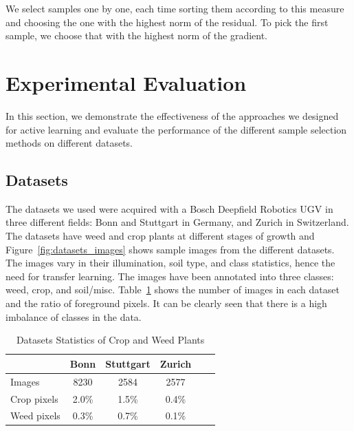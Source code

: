 \documentclass[letterpaper, 10 pt, conference]{ieeeconf}  %
\begin{document}
We select samples one by one, each time sorting them according to this measure and choosing the one with the highest norm of the residual. To pick the first sample, we choose that with the highest norm of the gradient.



\section{Experimental Evaluation}
\label{sec:exp}

In this section, we demonstrate the effectiveness of the approaches we designed for active learning and evaluate the performance of the different sample selection methods on different datasets.

\subsection{Datasets}

The datasets we used were acquired with a Bosch Deepfield Robotics UGV in three different fields: Bonn and Stuttgart in Germany, and Zurich in Switzerland. The datasets have weed and crop plants at different stages of growth and Figure~\ref{fig:datasets_images} shows sample images from the different datasets. The images vary in their illumination, soil type, and class statistics, hence the need for transfer learning. The images have been annotated into three classes:  weed, crop, and soil/misc.  Table~\ref{tab:datasets_stats} shows the number of images in each dataset and the ratio of foreground pixels. It can be clearly seen that there is a high imbalance of classes in the data.



    \begin{table}
       \vspace{1em}
        \centering
        \caption{Datasets Statistics of Crop and Weed Plants}
        \begin{tabular}{@{}lccccc@{}} 
            \toprule
              & Bonn & Stuttgart & Zurich \\ 
            \midrule 
    		  Images  & 8230 & 2584 & 2577 \\ \addlinespace
    		  Crop pixels & 2.0\% & 1.5\% & 0.4\%  \\ \addlinespace
    		  Weed pixels & 0.3\% & 0.7\% & 0.1\%  \\    
            \bottomrule
        \end{tabular}
        \label{tab:datasets_stats}
    \end{table}
     
\end{document}
